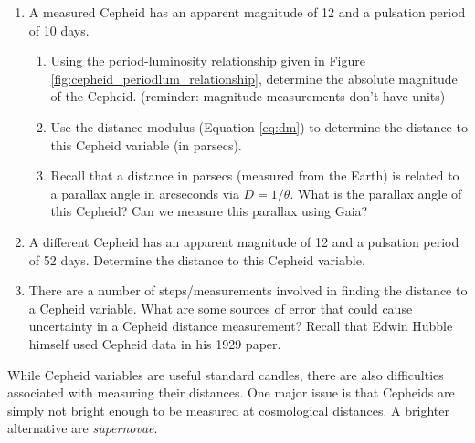 \documentclass[11pt]{article}
\begin{document}
\begin{enumerate}
    \item A measured Cepheid has an apparent magnitude of 12 and a pulsation period of 10 days. 
    \begin{enumerate}
        \item Using the period-luminosity relationship given in Figure \ref{fig:cepheid_periodlum_relationship}, determine the absolute magnitude of the Cepheid. (reminder: magnitude measurements don't have units)
        
        \item Use the distance modulus (Equation \ref{eq:dm}) to determine the distance to this Cepheid variable (in parsecs).
        
        \item Recall that a distance in parsecs (measured from the Earth) is related to a parallax angle in arcseconds via $D = 1/\theta$. What is the parallax angle of this Cepheid? Can we measure this parallax using Gaia?
    \end{enumerate} 
    
    \item A different Cepheid has an apparent magnitude of 12 and a pulsation period of 52 days. Determine the distance to this Cepheid variable. 
    
    \item There are a number of steps/measurements involved in finding the distance to a Cepheid variable. What are some sources of error that could cause uncertainty in a Cepheid distance measurement? Recall that Edwin Hubble himself used Cepheid data in his 1929 paper. 
\end{enumerate}


\medskip \noindent
While Cepheid variables are useful standard candles, there are also difficulties associated with measuring their distances. One major issue is that Cepheids are simply not bright enough to be measured at cosmological distances. A brighter alternative are \emph{supernovae}.
\end{document}

